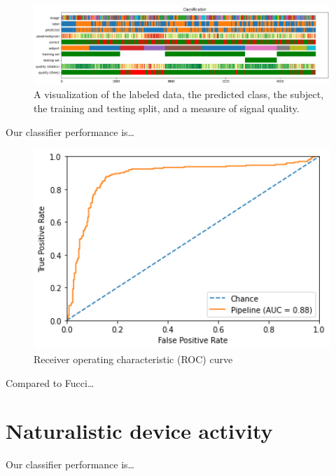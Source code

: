         \begin{figure}[h]
        \centering
        \includegraphics[width=16cm]{img/timebars.png}
        \caption{A visualization of the labeled data, the predicted class, the subject, the training and testing split, and a measure of signal quality.}\label{fig:timebars}
        \end{figure}

        Our classifier performance is\ldots

        \begin{figure}[h]
        \centering
        \includegraphics[width=12cm]{img/roccurve.png}
        \caption{Receiver operating characteristic (ROC) curve}\label{fig:roc}
        \end{figure}


        Compared to Fucci\ldots

    \section{Naturalistic device activity}

        Our classifier performance is\ldots

